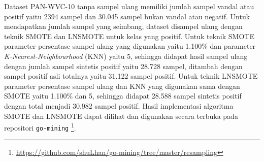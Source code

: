 Dataset PAN-WVC-10 tanpa sampel ulang memiliki jumlah sampel vandal atau
positif yaitu 2394 sampel dan 30.045 sampel bukan vandal atau negatif.
Untuk mendapatkan jumlah sampel yang seimbang, dataset disampel ulang dengan
teknik SMOTE dan LNSMOTE untuk kelas yang positif.
Untuk teknik SMOTE parameter persentase sampel ulang yang digunakan yaitu
1.100\% dan parameter \textit{K-Nearest-Neighbourhood} (KNN) yaitu 5,
sehingga didapat hasil sampel ulang dengan jumlah sampel sintetis positif yaitu
28.728 sampel, ditambah dengan sampel positif asli totalnya yaitu 31.122 sampel
positif.
Untuk teknik LNSMOTE parameter persentase sampel ulang dan KNN yang digunakan
sama dengan SMOTE yaitu 1.100\% dan 5, sehingga didapat 28.588 sampel
sintetis positif dengan total menjadi 30.982 sampel positif.
Hasil implementasi algoritma SMOTE dan LNSMOTE dapat dilihat dan digunakan
secara terbuka pada repositori \texttt{go-mining}
\footnote{\url{https://github.com/shuLhan/go-mining/tree/master/resampling}}.
